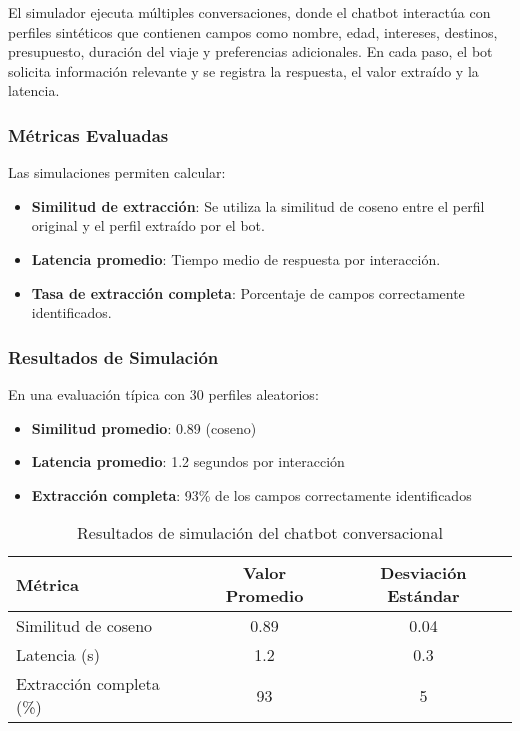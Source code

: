 \documentclass[runningheads]{llncs}
\begin{document}
El simulador ejecuta múltiples conversaciones, donde el chatbot interactúa con perfiles sintéticos que contienen campos como nombre, edad, intereses, destinos, presupuesto, duración del viaje y preferencias adicionales. En cada paso, el bot solicita información relevante y se registra la respuesta, el valor extraído y la latencia.

\subsubsection{Métricas Evaluadas}

Las simulaciones permiten calcular:
\begin{itemize}
    \item \textbf{Similitud de extracción}: Se utiliza la similitud de coseno entre el perfil original y el perfil extraído por el bot.
    \item \textbf{Latencia promedio}: Tiempo medio de respuesta por interacción.
    \item \textbf{Tasa de extracción completa}: Porcentaje de campos correctamente identificados.
\end{itemize}

\subsubsection{Resultados de Simulación}

En una evaluación típica con 30 perfiles aleatorios:
\begin{itemize}
    \item \textbf{Similitud promedio}: 0.89 (coseno)
    \item \textbf{Latencia promedio}: 1.2 segundos por interacción
    \item \textbf{Extracción completa}: 93\% de los campos correctamente identificados
\end{itemize}

\begin{table}[H]
\centering
\begin{tabular}{lcc}
\toprule
\textbf{Métrica} & \textbf{Valor Promedio} & \textbf{Desviación Estándar} \\
\midrule
Similitud de coseno & 0.89 & 0.04 \\
Latencia (s) & 1.2 & 0.3 \\
Extracción completa (\%) & 93 & 5 \\
\bottomrule
\end{tabular}
\caption{Resultados de simulación del chatbot conversacional}
\end{table}
\end{document}
